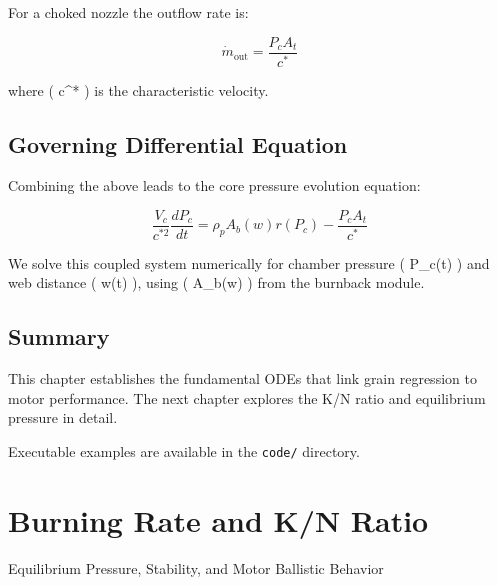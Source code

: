 \documentclass[
  letterpaper,
  DIV=11,
  numbers=noendperiod]{scrreprt}
\begin{document}
For a choked nozzle the outflow rate is:

\[
\dot{m}_\text{out} = \frac{P_c A_t}{c^*}
\]

where ( c\^{}* ) is the characteristic velocity.

\section{Governing Differential
Equation}\label{governing-differential-equation}

Combining the above leads to the core pressure evolution equation:

\[
\frac{V_c}{c^{*2}} \frac{dP_c}{dt} = \rho_p A_b(w) r(P_c) - \frac{P_c A_t}{c^*}
\]

We solve this coupled system numerically for chamber pressure ( P\_c(t)
) and web distance ( w(t) ), using ( A\_b(w) ) from the burnback module.

\section{Summary}\label{summary}

This chapter establishes the fundamental ODEs that link grain regression
to motor performance. The next chapter explores the K/N ratio and
equilibrium pressure in detail.

\begin{tcolorbox}[enhanced jigsaw, arc=.35mm, bottomrule=.15mm, bottomtitle=1mm, breakable, colback=white, colbacktitle=quarto-callout-note-color!10!white, colframe=quarto-callout-note-color-frame, coltitle=black, left=2mm, leftrule=.75mm, opacityback=0, opacitybacktitle=0.6, rightrule=.15mm, title=\textcolor{quarto-callout-note-color}{\faInfo}\hspace{0.5em}{Note}, titlerule=0mm, toprule=.15mm, toptitle=1mm]

Executable examples are available in the \texttt{code/} directory.

\end{tcolorbox}


\chapter{Burning Rate and K/N Ratio}\label{burning-rate-and-kn-ratio}

Equilibrium Pressure, Stability, and Motor Ballistic Behavior

\hfill\break
\end{document}
